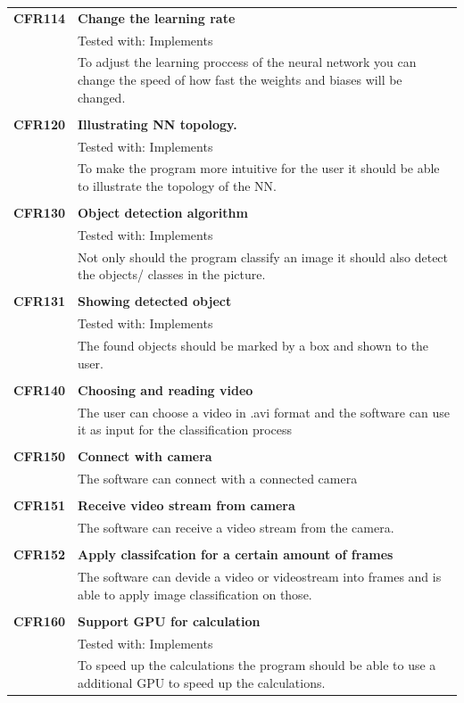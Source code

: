\documentclass[parskip=full]{scrartcl}
\begin{document}
\begin{tabular}{p{2cm}p{12cm}}
\textbf {CFR114} & \textbf{Change the learning rate} \\
& Tested with: Implements\\
& To adjust the learning proccess of the neural network you can change the speed of how fast the weights and biases will be changed.\\
& \\
\textbf {CFR120} & \textbf{Illustrating NN topology.} \\
& Tested with: Implements\\
& To make the program more intuitive for the user it should be able to illustrate the topology of the NN.\\
& \\
\textbf {CFR130} & \textbf{Object detection algorithm} \\
& Tested with: Implements\\
& Not only should the program classify an image it should also detect the objects/ classes in the picture. \\
& \\
\textbf {CFR131} & \textbf{Showing detected object} \\
& Tested with: Implements\\
& The found objects should be marked by a box and shown to the user. \\
& \\
\textbf{CFR140} & \textbf{Choosing and reading video}\\
& The user can choose a video in .avi format and the software can use it as input for the classification process\\
& \\
\textbf{CFR150} & \textbf{Connect with camera}\\
& The software can connect with a connected camera\\
& \\
\textbf{CFR151} & \textbf{Receive video stream from camera}\\
& The software can receive a video stream from the camera.\\
& \\
\textbf{CFR152} & \textbf{Apply classifcation for a certain amount of frames}\\
& The software can devide a video or videostream into frames and is able to apply image classification on those.\\
& \\
\textbf {CFR160} & \textbf{Support GPU for calculation} \\
& Tested with: Implements\\
& To speed up the calculations the program should be able to use a additional GPU to speed up the calculations.\\
\end{tabular}
\end{document}
